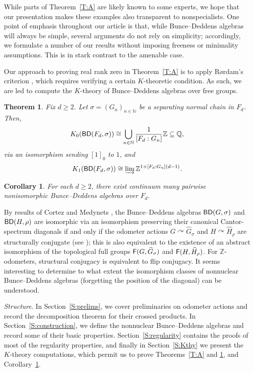 \documentclass[11pt,a4,leqno]{amsart}
\theoremstyle{definition}
\theoremstyle{remark}
\numberwithin{equation}{section}
\theoremstyle{plain}
\newcounter{theoremintro}
\newtheorem{thmx}[theoremintro]{Theorem}
\newtheorem{corx}[theoremintro]{Corollary}
\newcommand{\Nb}{\mathbb{N}}
\newcommand{\Zb}{\mathbb{Z}}
\newcommand{\Qb}{\mathbb{Q}}
\newcommand{\fF}{{\sf{F}}}
\newcommand{\BD}{{\sf{BD}}}
\begin{document}
While parts of Theorem~\ref{T:A} are likely known to some experts, we hope that our presentation makes these examples also transparent to nonspecialists. One point of emphasis throughout our article is that, while Bunce--Deddens algebras will always be simple, several arguments do not rely on simplicity; accordingly, we formulate a number of our results without imposing freeness or minimality assumptions. This is in stark contrast to the amenable case. 

Our approach to proving real rank zero in Theorem~\ref{T:A} is to apply R{\o}rdam's criterion \cite{Ror04}, which requires verifying a certain $K$-theoretic condition. As such, we are led to compute the $K$-theory of Bunce--Deddens algebras over free groups.  

\begin{thmx}\label{T:B}
    Fix $d\ge 2$. Let $\sigma = (G_n)_{n\in\Nb}$ be a separating normal chain in $F_d$. Then, 
    \[
        K_0(\BD(F_d,\sigma)) \cong \bigcup_{n\in\Nb} \frac{1}{[F_d : G_n]}\Zb\subseteq \Qb,
    \]
    via an isomorphism sending $[1]_0$ to $1$, and 
    \[
        K_1(\BD(F_d,\sigma)) \cong \varinjlim \Zb^{1 + [F_d:G_n](d-1)}. 
    \]
\end{thmx}

\begin{corx}\label{C:C}
    For each $d\ge 2$, there exist continuum many pairwise nonisomorphic Bunce--Deddens algebras over $F_d$. 
\end{corx}

By results of Cortez and Medynets \cite{CorMed16}, the Bunce--Deddens algebras $\BD (G,\sigma)$ and $\BD (H,\rho)$ are isomorphic via an isomorphism preserving their canonical Cantor-spectrum diagonals if and only if the odometer actions $G\curvearrowright \widehat{G}_\sigma$ and $H\curvearrowright \widehat{H}_\rho$ are structurally conjugate (see \cite[Definition 3.1]{CorMed16}); this is also equivalent to the existence of an abstract isomorphism of the topological full groups $\fF (G,\widehat{G}_\sigma)$ and $\fF (H,\widehat{H}_\rho)$. For $\Zb$-odometers, structural conjugacy is equivalent to flip conjugacy. It seems interesting to determine to what extent the isomorphism classes of nonnuclear Bunce--Deddens algebras (forgetting the position of the diagonal) can be understood.  

\medskip
\noindent\textit{Structure}. In Section~\ref{S:prelims}, we cover preliminaries on odometer actions and record the decomposition theorem for their crossed products. In Section~\ref{S:construction}, we define the nonnuclear Bunce--Deddens algebras and record some of their basic properties. Section~\ref{S:regularity} contains the proofs of most of the regularity properties, and finally in Section~\ref{S:Kthy} we present the $K$-theory computations, which permit us to prove Theorems~\ref{T:A} and \ref{T:B}, and Corollary~\ref{C:C}. 
\end{document}
